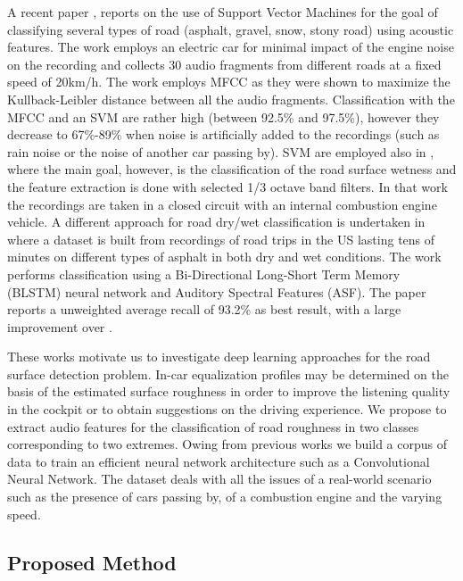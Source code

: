 A recent paper \cite{DoganRoad2017}, reports on the use of Support Vector Machines for the goal of classifying several types of road (asphalt, gravel, snow, stony road) using acoustic features. The work employs an electric car for minimal impact of the engine noise on the recording and collects 30 audio fragments from different roads at a fixed speed of 20km/h. The work employs MFCC as they were shown to maximize the Kullback-Leibler distance between all the audio fragments. Classification with the MFCC and an SVM are rather high (between 92.5\% and 97.5\%), however they decrease to 67\%-89\% when noise is artificially added to the recordings (such as rain noise or the noise of another car passing by).
SVM are employed also in \cite{alonso2014board}, where the main goal, however, is the classification of the road surface wetness and the feature extraction is done with selected 1/3 octave band filters. In that work the recordings are taken in a closed circuit with an internal combustion engine vehicle.
A different approach for road dry/wet classification is undertaken in \cite{abdic2016detecting} where a dataset is built from recordings of road trips in the US lasting tens of minutes on different types of asphalt in both dry and wet conditions. The work performs classification using a Bi-Directional Long-Short Term Memory (BLSTM) neural network \cite{hochreiter1997long} and Auditory Spectral Features (ASF). The paper reports a unweighted average recall of 93.2\% as best result, with a large improvement over \cite{alonso2014board}.

These works motivate us to investigate deep learning approaches for the road surface detection problem. In-car equalization profiles may be determined on the basis of the estimated surface roughness in order to improve the listening quality in the cockpit or to obtain suggestions on the driving experience. We propose to extract audio features for the classification of road roughness in two classes corresponding to two extremes. Owing from previous works we build a corpus of data to train an efficient neural network architecture such as a Convolutional Neural Network. The dataset deals with all the issues of a real-world scenario such as the presence of cars passing by, of a combustion engine and the varying speed. %

\subsection{Proposed Method}

